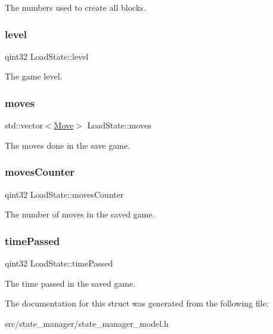 The numbers used to create all blocks. \mbox{\label{struct_load_state_ab48ca57dd161df569b22a88f457df244}} 
\subsubsection{\texorpdfstring{level}{level}}
{\footnotesize\ttfamily qint32 Load\+State\+::level}

The game level. \mbox{\label{struct_load_state_a00e978ec8c48f99e7007814da01f328b}} 
\subsubsection{\texorpdfstring{moves}{moves}}
{\footnotesize\ttfamily std\+::vector$<$\mbox{\hyperlink{struct_move}{Move}}$>$ Load\+State\+::moves}

The moves done in the save game. \mbox{\label{struct_load_state_a72929d48135962cbff700c440a57553f}} 
\subsubsection{\texorpdfstring{movesCounter}{movesCounter}}
{\footnotesize\ttfamily qint32 Load\+State\+::moves\+Counter}

The number of moves in the saved game. \mbox{\label{struct_load_state_a1c37e682001c48d107c981f9e225e83c}} 
\subsubsection{\texorpdfstring{timePassed}{timePassed}}
{\footnotesize\ttfamily qint32 Load\+State\+::time\+Passed}

The time passed in the saved game. 

The documentation for this struct was generated from the following file\+:\begin{DoxyCompactItemize}
\item 
src/state\+\_\+manager/state\+\_\+manager\+\_\+model.\+h\end{DoxyCompactItemize}
